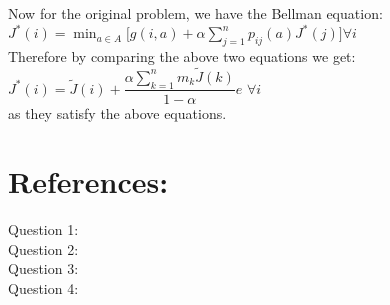 \documentclass{article}
\begin{document}
Now for the original problem, we have the Bellman equation:\\
$J^*(i)=\displaystyle \min_{a \in A} \Big[ g(i,a)+\alpha \displaystyle \sum_{j=1}^{n}p_{ij}(a)J^*(j)\Big] \forall i$\\
Therefore by comparing the above two equations we get:
$J^*(i)=\tilde{J}(i)+\dfrac{\alpha   \sum_{k=1}^{n}m_k \tilde{J}(k)}{1-\alpha}e $  $ \forall i$\\
as they satisfy the above equations.


\section{References:}
Question 1: \\
Question 2: \\
Question 3:\\
Question 4: \\
\end{document}
